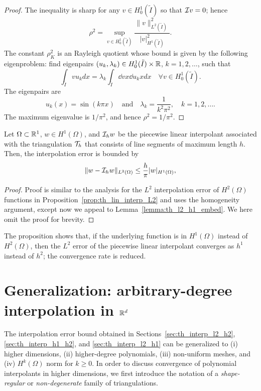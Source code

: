 \begin{proposition}
\begin{proof}
  The inequality is sharp for any $v \in H^1_0(\tilde I)$ so that $\mathcal{I} v = 0$; hence
   \begin{equation*} 
     \rho^2 =\sup_{v \in H^1_0(\tilde I)} \frac{\| v \|^2_{L^2(\tilde I)}}{| v |_{H^1(\tilde I)}^2}.
  \end{equation*}
  The constant $\rho_K^2$ is an Rayleigh quotient whose bound is given by the following eigenproblem: find eigenpairs $(u_k,\lambda_k) \in H^1_0(\tilde I) \times \mathbb{R}$, $k = 1,2,\dots$, such that
  \begin{equation*}
    \int_{\tilde I} v u_k dx = \lambda_k \int_{\tilde I} \dd{v}{x} \dd{u_k}{x} dx \quad \forall v \in H^1_0(\tilde I).
  \end{equation*}
  The eigenpairs are
  \begin{equation*}
    u_k(x) = \sin(k\pi x) \quad \text{and} \quad \lambda_k = \frac{1}{k^2\pi^2}, \quad k = 1,2,\dots.
  \end{equation*}
  The maximum eigenvalue is $1/\pi^2$, and hence $\rho^2 = 1/\pi^2$.
\end{proof}
\end{proposition}

\begin{proposition}
  \label{prop:th_lin_interp_L2_H1}
  Let $\Omega \subset \mathbb{R}^1$, $w \in H^1(\Omega)$, and $\mathcal{I}_h w$ be the piecewise linear interpolant associated with the triangulation $\mathcal{T}_h$ that consists of line segments of maximum length $h$. Then, the interpolation error is bounded by
  \begin{equation*}
    \| w - \mathcal{I}_h w \|_{L^2(\Omega)}
    \leq \frac{h}{\pi} | w |_{H^1(\Omega)},
  \end{equation*}
  \begin{proof}
    Proof is similar to the analysis for the $L^2$ interpolation error of $H^2(\Omega)$ functions in Proposition~\ref{prop:th_lin_interp_L2} and uses the homogeneity argument, except now we appeal to Lemma~\ref{lemma:th_l2_h1_embed}. We here omit the proof for brevity.
  \end{proof}
\end{proposition}
The proposition shows that, if the underlying function is in $H^1(\Omega)$ instead of $H^2(\Omega)$, then the $L^2$ error of the piecewise linear interpolant converges as $h^1$ instead of $h^2$; the convergence rate is reduced. 

\section{Generalization: arbitrary-degree interpolation in $\mathbb{R}^d$}
\label{sec:th_poly_gen}
The interpolation error bound obtained in Sections~\ref{sec:th_interp_l2_h2}, \ref{sec:th_interp_h1_h2}, and \ref{sec:th_interp_l2_h1} can be generalized to (i) higher dimensions, (ii) higher-degree polynomials, (iii) non-uniform meshes, and (iv) $H^k(\Omega)$ norm for $k \geq 0$.  In order to discuss convergence of polynomial interpolants in higher dimensions, we first introduce the notation of a \emph{shape-regular} or \emph{non-degenerate} family of triangulations.

